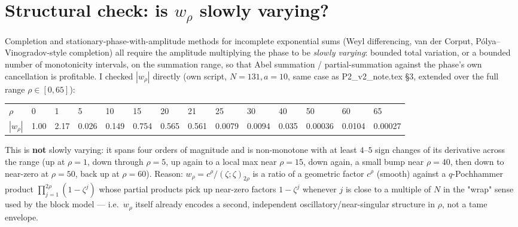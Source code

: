 \documentclass[11pt]{article}
\begin{document}
\section{Structural check: is $w_\rho$ slowly varying?}
Completion and stationary-phase-with-amplitude methods for incomplete exponential sums (Weyl
differencing, van der Corput, Pólya--Vinogradov-style completion) all require the amplitude
multiplying the phase to be \emph{slowly varying}: bounded total variation, or a bounded number of
monotonicity intervals, on the summation range, so that Abel summation / partial-summation against
the phase's own cancellation is profitable. I checked $|w_\rho|$ directly (own script, $N=131,a=10$,
same case as P2\_v2\_note.tex \S3, extended over the full range $\rho\in[0,65]$):
\begin{center}\small
\begin{tabular}{lllllllllllll}\toprule
$\rho$&0&1&5&10&15&20&21&25&30&40&50&60&65\\
$|w_\rho|$&1.00&2.17&0.026&0.149&0.754&0.565&0.561&0.0079&0.0094&0.035&0.00036&0.0104&0.00027\\\bottomrule
\end{tabular}\end{center}
This is \textbf{not} slowly varying: it spans four orders of magnitude and is non-monotone with at
least $4$--$5$ sign changes of its derivative across the range (up at $\rho=1$, down through $\rho=5$,
up again to a local max near $\rho=15$, down again, a small bump near $\rho=40$, then down to near-zero
at $\rho=50$, back up at $\rho=60$). Reason: $w_\rho=c^\rho/(\zeta;\zeta)_{2\rho}$ is a ratio of a
geometric factor $c^\rho$ (smooth) against a $q$-Pochhammer product $\prod_{j=1}^{2\rho}(1-\zeta^j)$
whose partial products pick up near-zero factors $1-\zeta^j$ whenever $j$ is close to a multiple of
$N$ in the "wrap" sense used by the block model — i.e.\ $w_\rho$ itself already encodes a second,
independent oscillatory/near-singular structure in $\rho$, not a tame envelope.
\end{document}
